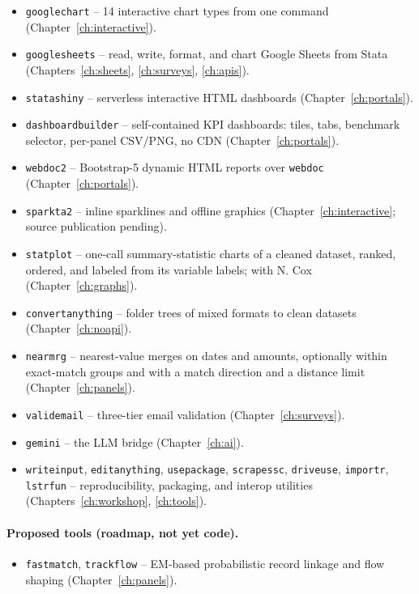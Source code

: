 \documentclass[
    a4paper,
    fontsize=10pt,
    twoside=true,
    numbers=noenddot,
]{kaobook}
\begin{document}
\begin{itemize}
    \item \texttt{googlechart} -- 14 interactive chart types from one command (Chapter~\ref{ch:interactive}).
    \item \texttt{googlesheets} -- read, write, format, and chart Google Sheets from Stata (Chapters~\ref{ch:sheets}, \ref{ch:surveys}, \ref{ch:apis}).
    \item \texttt{statashiny} -- serverless interactive HTML dashboards (Chapter~\ref{ch:portals}).
    \item \texttt{dashboardbuilder} -- self-contained KPI dashboards: tiles, tabs, benchmark selector, per-panel CSV/PNG, no CDN (Chapter~\ref{ch:portals}).
    \item \texttt{webdoc2} -- Bootstrap-5 dynamic HTML reports over \texttt{webdoc} (Chapter~\ref{ch:portals}).
    \item \texttt{sparkta2} -- inline sparklines and offline graphics (Chapter~\ref{ch:interactive}; source publication pending).
    \item \texttt{statplot} -- one-call summary-statistic charts of a cleaned dataset, ranked, ordered, and labeled from its variable labels; with N. Cox (Chapter~\ref{ch:graphs}).
    \item \texttt{convertanything} -- folder trees of mixed formats to clean datasets (Chapter~\ref{ch:noapi}).
    \item \texttt{nearmrg} -- nearest-value merges on dates and amounts, optionally within exact-match groups and with a match direction and a distance limit (Chapter~\ref{ch:panels}).
    \item \texttt{validemail} -- three-tier email validation (Chapter~\ref{ch:surveys}).
    \item \texttt{gemini} -- the LLM bridge (Chapter~\ref{ch:ai}).
    \item \texttt{writeinput}, \texttt{editanything}, \texttt{usepackage}, \texttt{scrapessc}, \texttt{driveuse}, \texttt{importr}, \texttt{lstrfun} -- reproducibility, packaging, and interop utilities (Chapters~\ref{ch:workshop}, \ref{ch:tools}).
\end{itemize}

\paragraph{Proposed tools (roadmap, not yet code).}
\begin{itemize}
    \item \texttt{fastmatch}, \texttt{trackflow} -- EM-based probabilistic record linkage and flow shaping (Chapter~\ref{ch:panels}).
\end{itemize}
\end{document}
